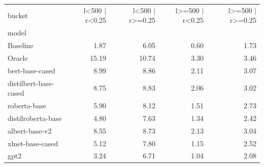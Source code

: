 \begin{tabular}{lrrrr}
\toprule
bucket & l<500 | r<0.25 & l<500 | r>=0.25 & l>=500 | r<0.25 & l>=500 | r>=0.25 \\
model &  &  &  &  \\
\midrule
Baseline & 1.87 & 6.05 & 0.60 & 1.73 \\
Oracle & 15.19 & 10.74 & 3.30 & 3.46 \\
bert-base-cased & 8.99 & 8.86 & 2.11 & 3.07 \\
distilbert-base-cased & 8.75 & 8.83 & 2.06 & 3.02 \\
roberta-base & 5.90 & 8.12 & 1.51 & 2.73 \\
distilroberta-base & 4.80 & 7.63 & 1.34 & 2.42 \\
albert-base-v2 & 8.55 & 8.73 & 2.13 & 3.04 \\
xlnet-base-cased & 5.12 & 7.80 & 1.15 & 2.52 \\
gpt2 & 3.24 & 6.71 & 1.04 & 2.08 \\
\bottomrule
\end{tabular}
